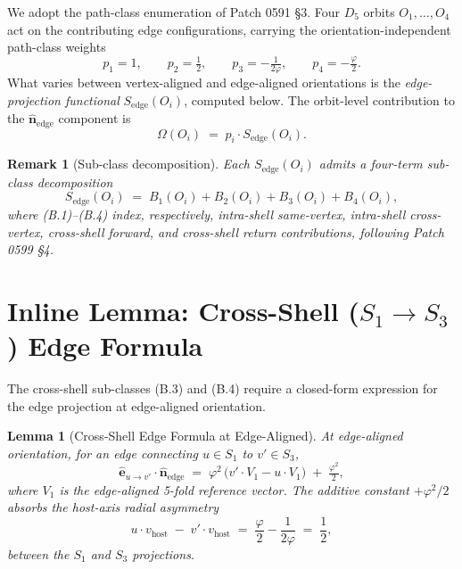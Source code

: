 \documentclass[11pt]{article}
\newtheorem{lemma}{Lemma}
\newtheorem{remark}{Remark}
\begin{document}
We adopt the path-class enumeration of Patch 0591 §3. Four $D_5$ orbits
$O_1,\ldots,O_4$ act on the contributing edge configurations, carrying
the orientation-independent path-class weights
\begin{equation}
p_1 = 1, \qquad p_2 = \tfrac{1}{2}, \qquad
p_3 = -\tfrac{1}{2\varphi}, \qquad p_4 = -\tfrac{\varphi}{2}.
\label{eq:weights}
\end{equation}
What varies between vertex-aligned and edge-aligned orientations is the
\emph{edge-projection functional} $S_{\text{edge}}(O_i)$, computed below.
The orbit-level contribution to the $\hat{\mathbf{n}}_{\text{edge}}$
component is
\begin{equation}
\Omega(O_i) \;=\; p_i \cdot S_{\text{edge}}(O_i).
\label{eq:Omega}
\end{equation}

\begin{remark}[Sub-class decomposition]
Each $S_{\text{edge}}(O_i)$ admits a four-term sub-class decomposition
\[
S_{\text{edge}}(O_i) \;=\; B_1(O_i) + B_2(O_i) + B_3(O_i) + B_4(O_i),
\]
where (B.1)--(B.4) index, respectively, intra-shell same-vertex,
intra-shell cross-vertex, cross-shell forward, and cross-shell return
contributions, following Patch 0599 §4.
\end{remark}

\section{Inline Lemma: Cross-Shell ($S_1 \to S_3$) Edge Formula}

The cross-shell sub-classes (B.3) and (B.4) require a closed-form
expression for the edge projection at edge-aligned orientation.

\begin{lemma}[Cross-Shell Edge Formula at Edge-Aligned]\label{lem:crossshell}
At edge-aligned orientation, for an edge connecting $u \in S_1$ to
$v' \in S_3$,
\begin{equation}
\hat{\mathbf{e}}_{u\to v'} \cdot \hat{\mathbf{n}}_{\text{edge}}
\;=\; \varphi^2 \,\bigl(v' \cdot V_1 - u \cdot V_1\bigr)
\;+\; \tfrac{\varphi^2}{2},
\label{eq:crossshell}
\end{equation}
where $V_1$ is the edge-aligned 5-fold reference vector. The additive
constant $+\varphi^2/2$ absorbs the host-axis radial asymmetry
\[
u \cdot v_{\text{host}} \;-\; v' \cdot v_{\text{host}}
\;=\; \frac{\varphi}{2} - \frac{1}{2\varphi}
\;=\; \frac{1}{2},
\]
between the $S_1$ and $S_3$ projections.
\end{lemma}
\end{document}

